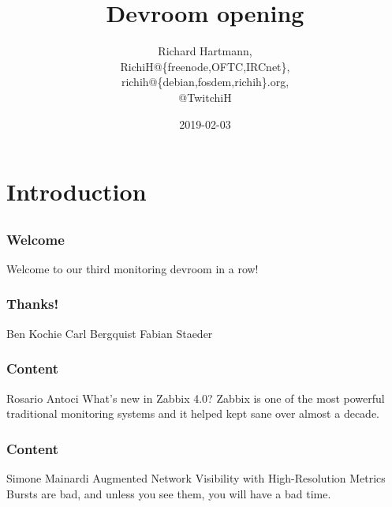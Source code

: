 \documentclass[aspectratio=169]{beamer}
\title{Devroom opening}
\subtitle{}
\author{Richard Hartmann,\\
RichiH@\{freenode,OFTC,IRCnet\},\\
richih@\{debian,fosdem,richih\}.org,\\
@TwitchiH}
\date{2019-02-03}
\begin{document}
\setcounter{tocdepth}{1}

\section{Introduction}

\subsection{}

\begin{frame}
	\titlepage
\end{frame}


\subsection{}

\begin{frame}
	\frametitle{Welcome}
	\begin{center}
		\vfill
		Welcome to our third monitoring devroom in a row!
		\vfill
	\end{center}
\end{frame}

\begin{frame}
	\frametitle{Thanks!}
	\begin{center}
		\vfill
		Ben Kochie
		\vfill
		Carl Bergquist
		\vfill
		Fabian Staeder
		\vfill
	\end{center}
\end{frame}

\begin{frame}
	\frametitle{Content}
	\begin{center}
		\vfill
		Rosario Antoci
		\vfill
		What's new in Zabbix 4.0?
		\vfill
		Zabbix is one of the most powerful traditional monitoring systems and it helped kept sane over almost a decade.
		\vfill
	\end{center}
\end{frame}

\begin{frame}
	\frametitle{Content}
	\begin{center}
		\vfill
		Simone Mainardi
		\vfill
		Augmented Network Visibility with High-Resolution Metrics
		\vfill
		Bursts are bad, and unless you see them, you will have a bad time.
		\vfill
	\end{center}
\end{frame}
\end{document}
